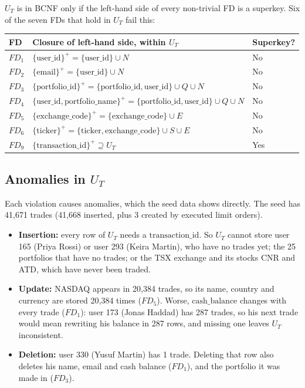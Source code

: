 \documentclass{article}
\newcommand{\at}[1]{\text{#1}}
\newcommand{\cl}[1]{\{#1\}^+}
\begin{document}
$U_T$ is in BCNF only if the left-hand side of every non-trivial FD is a superkey. Six of the seven FDs that hold in $U_T$ fail this:
\begin{center}
\begin{tabular}{l l l}
  \toprule
  \textbf{FD} & \textbf{Closure of left-hand side, within $U_T$} & \textbf{Superkey?} \\
  \midrule
  $FD_1$ & $\cl{\at{user\_id}} = \{\at{user\_id}\} \cup N$ & No \\
  $FD_2$ & $\cl{\at{email}} = \{\at{user\_id}\} \cup N$ & No \\
  $FD_3$ & $\cl{\at{portfolio\_id}} = \{\at{portfolio\_id}, \at{user\_id}\} \cup Q \cup N$ & No \\
  $FD_4$ & $\cl{\at{user\_id}, \at{portfolio\_name}} = \{\at{portfolio\_id}, \at{user\_id}\} \cup Q \cup N$ & No \\
  $FD_5$ & $\cl{\at{exchange\_code}} = \{\at{exchange\_code}\} \cup E$ & No \\
  $FD_6$ & $\cl{\at{ticker}} = \{\at{ticker}, \at{exchange\_code}\} \cup S \cup E$ & No \\
  $FD_9$ & $\cl{\at{transaction\_id}} \supseteq U_T$ & Yes \\
  \bottomrule
\end{tabular}
\end{center}

\subsection*{Anomalies in $U_T$}

Each violation causes anomalies, which the seed data shows directly. The seed has 41{,}671 trades (41{,}668 inserted, plus 3 created by executed limit orders).
\begin{itemize}[leftmargin=*]
  \item \textbf{Insertion:} every row of $U_T$ needs a $\at{transaction\_id}$. So $U_T$ cannot store user 165 (Priya Rossi) or user 293 (Keira Martin), who have no trades yet; the 25 portfolios that have no trades; or the TSX exchange and its stocks CNR and ATD, which have never been traded.
  \item \textbf{Update:} NASDAQ appears in 20{,}384 trades, so its name, country and currency are stored 20{,}384 times ($FD_5$). Worse, $\at{cash\_balance}$ changes with every trade ($FD_1$): user 173 (Jonas Haddad) has 287 trades, so his next trade would mean rewriting his balance in 287 rows, and missing one leaves $U_T$ inconsistent.
  \item \textbf{Deletion:} user 330 (Yusuf Martin) has 1 trade. Deleting that row also deletes his name, email and cash balance ($FD_1$), and the portfolio it was made in ($FD_3$).
\end{itemize}
\end{document}
